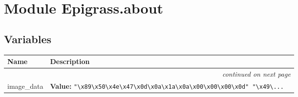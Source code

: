 %
%
%


\section{Module Epigrass.about}

    \label{Epigrass:about}


  \subsection{Variables}

\begin{longtable}{|p{}|p{}|l}
\cline{1-2}
\cline{1-2} \centering \textbf{Name} & \centering \textbf{Description}& \\
\cline{1-2}
\endhead\cline{1-2}\multicolumn{3}{r}{\small\textit{continued on next page}}\\\endfoot\cline{1-2}
\endlastfoot\raggedright i\-m\-a\-g\-e\-0\-\_\-d\-a\-t\-a\- & \raggedright \textbf{Value:} 
{\tt "{\textbackslash}x89{\textbackslash}x50{\textbackslash}x4e{\textbackslash}x47{\textbackslash}x0d{\textbackslash}x0a{\textbackslash}x1a{\textbackslash}x0a{\textbackslash}x00{\textbackslash}x00{\textbackslash}x00{\textbackslash}x0d" "{\textbackslash}x49{\textbackslash}\texttt{...}}&\\
\cline{1-2}
\end{longtable}



